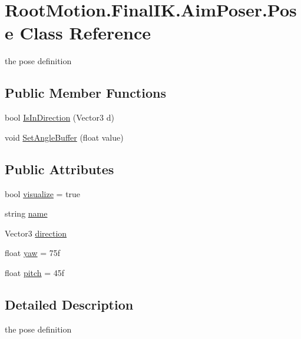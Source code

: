 \hypertarget{class_root_motion_1_1_final_i_k_1_1_aim_poser_1_1_pose}{}\section{Root\+Motion.\+Final\+I\+K.\+Aim\+Poser.\+Pose Class Reference}
\label{class_root_motion_1_1_final_i_k_1_1_aim_poser_1_1_pose}


the pose definition  


\subsection*{Public Member Functions}
\begin{DoxyCompactItemize}
\item 
bool \mbox{\hyperlink{class_root_motion_1_1_final_i_k_1_1_aim_poser_1_1_pose_a7e9d321be9174ca1fa5b8eb90339cccd}{Is\+In\+Direction}} (Vector3 d)
\item 
void \mbox{\hyperlink{class_root_motion_1_1_final_i_k_1_1_aim_poser_1_1_pose_a7d11d9482c567af6721beb0e142d83fa}{Set\+Angle\+Buffer}} (float value)
\end{DoxyCompactItemize}
\subsection*{Public Attributes}
\begin{DoxyCompactItemize}
\item 
bool \mbox{\hyperlink{class_root_motion_1_1_final_i_k_1_1_aim_poser_1_1_pose_a86c56969435180d948fd9a083df0d71d}{visualize}} = true
\item 
string \mbox{\hyperlink{class_root_motion_1_1_final_i_k_1_1_aim_poser_1_1_pose_a3ffcd1188a96c176ecc32435a2f05d04}{name}}
\item 
Vector3 \mbox{\hyperlink{class_root_motion_1_1_final_i_k_1_1_aim_poser_1_1_pose_a788d492ea99a67ee1716167adf704223}{direction}}
\item 
float \mbox{\hyperlink{class_root_motion_1_1_final_i_k_1_1_aim_poser_1_1_pose_a2b70f8152c3a97c606d321571319ec2b}{yaw}} = 75f
\item 
float \mbox{\hyperlink{class_root_motion_1_1_final_i_k_1_1_aim_poser_1_1_pose_abceafe765b1a6233c5d210106d404227}{pitch}} = 45f
\end{DoxyCompactItemize}


\subsection{Detailed Description}
the pose definition 



